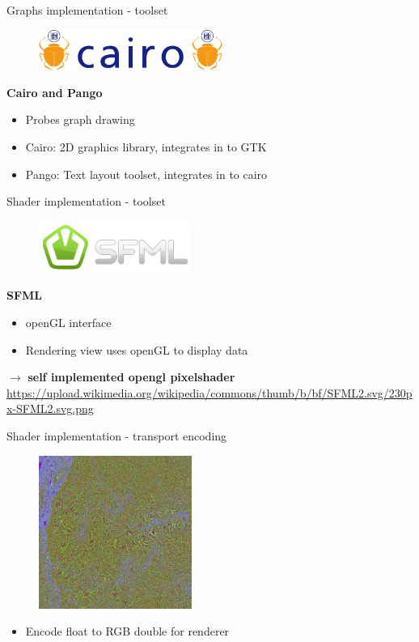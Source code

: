 \documentclass[shortpres,usenames,dvipsnames]{beamer}
\begin{document}
\begin{frame}[fragile]{Graphs implementation - toolset}
	\begin{figure}
		\includegraphics[clip, width=60mm]{img/cairo.png}
	\end{figure}
	\textbf{Cairo and Pango}\\
	\begin{itemize}
		\item Probes graph drawing
		\item Cairo: 2D graphics library, integrates in to GTK
		\item Pango: Text layout toolset, integrates in to cairo
	\end{itemize}
\end{frame}

\begin{frame}[fragile]{Shader implementation - toolset}
	\begin{figure}
		\includegraphics[clip, width=50mm]{img/sfml.png}
	\end{figure}
	\textbf{SFML}\\
	\begin{itemize}
		\item openGL interface
		\item Rendering view uses openGL to display data
	\end{itemize}
	$\rightarrow$ \textbf{self implemented opengl pixelshader}\\
	\vfill
	\flushleft
	{\fontsize{5}{5} \selectfont \url{https://upload.wikimedia.org/wikipedia/commons/thumb/b/bf/SFML2.svg/230px-SFML2.svg.png}}
\end{frame}

\begin{frame}[fragile]{Shader implementation - transport encoding}
	\begin{figure}
		\includegraphics[clip, width=50mm]{img/transport_encoding.jpg}
	\end{figure}
	\begin{itemize}
		\item Encode float to RGB double for renderer
	\end{itemize}
\end{frame}
\end{document}
